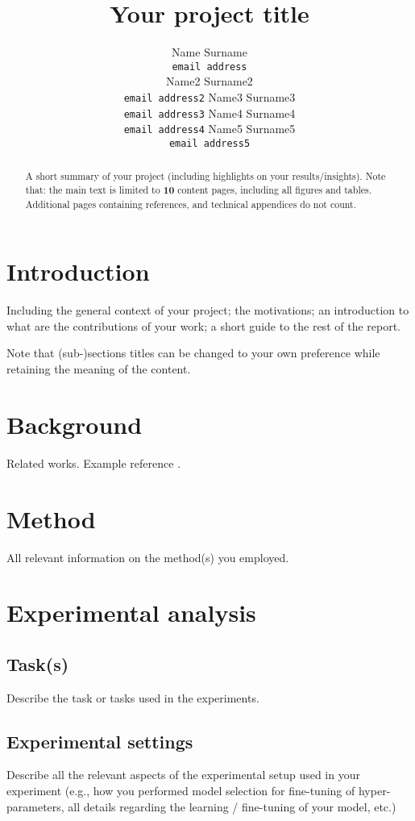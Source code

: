 \documentclass{article}
\title{Your project title}
\author{%
  Name Surname\\
  \texttt{email address} \\
  \And
  Name2 Surname2\\
  \texttt{email address2}
  \And
  Name3 Surname3\\
  \texttt{email address3}
  \And
  Name4 Surname4\\
  \texttt{email address4}
  \And
  Name5 Surname5\\
  \texttt{email address5}
}
\begin{document}
\maketitle


\begin{abstract}
  A short summary of your project (including highlights on your results/insights).
  Note that: the main text is limited to \textbf{10} content pages, including all figures and tables. Additional pages containing references, and technical appendices do not count.

\end{abstract}


\section{Introduction}
Including the general context of your project; the motivations; an introduction to what are the contributions of your work; a short guide to the rest of the report.

Note that (sub-)sections titles can be changed to your own preference while retaining the meaning of the content.

\section{Background}
Related works.
Example reference \citep{lecun2015deep}.

\section{Method}
All relevant information on the method(s) you employed.

\section{Experimental analysis}
\subsection{Task(s)}
Describe the task or tasks used in the experiments.
\subsection{Experimental settings}
Describe all the relevant aspects of the experimental setup used in your experiment (e.g., how you performed model selection for fine-tuning of hyper-parameters, all details regarding the learning / fine-tuning of your model, etc.)
\end{document}

